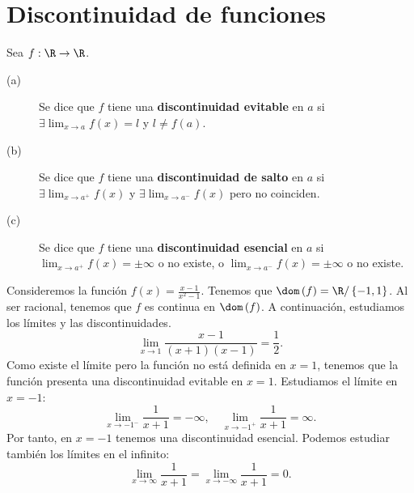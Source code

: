 \section{Discontinuidad de funciones}
\begin{fdefinition}[]
\normalfont Sea $\displaystyle f : \R \to \R $. 
\begin{description}
\item[(a)] Se dice que $\displaystyle f $ tiene una \textbf{discontinuidad evitable} en $\displaystyle a $ si $\displaystyle \exists \lim_{x \to a}f\left(x\right) = l $ y $\displaystyle l \neq f\left(a\right) $.
\item[(b)] Se dice que $\displaystyle f $ tiene una \textbf{discontinuidad de salto} en $\displaystyle a $ si $\displaystyle \exists \lim_{x \to a^{+}}f\left(x\right) $ y $\displaystyle \exists \lim_{x \to a^{-}}f\left(x\right) $ pero no coinciden.
\item[(c)] Se dice que $\displaystyle f $ tiene una \textbf{discontinuidad esencial} en $\displaystyle a $ si $\displaystyle \lim_{x \to a^{+}}f\left(x\right) = \pm \infty $ o no existe, o $\displaystyle \lim_{x \to a^{-}}f\left(x\right) = \pm \infty $ o no existe.
\end{description}
\end{fdefinition}
\begin{eg}
	\normalfont Consideremos la función $\displaystyle f\left(x\right) = \frac{x - 1}{x^{2} - 1} $. Tenemos que $\displaystyle \dom\left(f\right) = \R / \left\{ - 1, 1\right\}  $. Al ser racional, tenemos que $\displaystyle f $ es continua en $\displaystyle \dom\left(f\right) $. A continuación, estudiamos los límites y las discontinuidades.
	\[\lim_{x \to 1}\frac{x - 1}{\left(x + 1\right)\left(x - 1\right)} = \frac{1}{2} .\]
Como existe el límite pero la función no está definida en $\displaystyle x = 1 $, tenemos que la función presenta una discontinuidad evitable en $\displaystyle x = 1 $. Estudiamos el límite en $\displaystyle x = - 1 $:
\[\lim_{x \to -1^{-}}\frac{1}{x + 1} = - \infty, \quad \lim_{x \to -1^{+}}\frac{1}{x+1} = \infty .\]
Por tanto, en $\displaystyle x = - 1 $ tenemos una discontinuidad esencial. Podemos estudiar también los límites en el infinito:
\[\lim_{x \to \infty} \frac{1}{x+1} = \lim_{x \to -\infty}\frac{1}{x+1} = 0 .\]
\end{eg}

